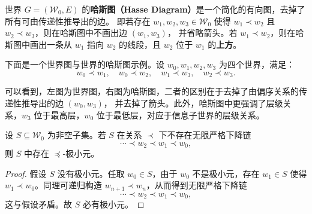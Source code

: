 \begin{definition}[世界的哈斯图]\label{def:hasse}
    世界 $G=(\mathcal{W}_0,E)$ 的\textbf{哈斯图（Hasse Diagram）}是一个简化的有向图，去掉了所有可由传递性推导出的边。
    即若存在 $w_1,w_2,w_3\in\mathcal{W}_0$ 使得 $w_1 \prec w_2$ 且 $w_2 \prec w_3$，则在哈斯图中不画出边 $(w_1,w_3)$，
    并省略箭头。若 $w_1 \prec w_2$，则在哈斯图中画出一条从 $w_1$ 指向 $w_2$ 的线段，且 $w_2$ 位于 $w_1$ 的\textbf{上方}。
\end{definition}
\begin{example}
    下面是一个世界图与世界的哈斯图示例。设 $w_0,w_1,w_2,w_3$ 为四个世界，满足：
    \begin{equation}
        w_0 \prec w_1,\quad w_0 \prec w_2,\quad w_1 \prec w_3,\quad w_2 \prec w_3.
    \end{equation}
    \begin{center}
        \qquad
    \end{center}
    可以看到，左图为世界图，右图为哈斯图，二者的区别在于去掉了由偏序关系的传递性推导出的边 $(w_0,w_3)$，
    并去掉了箭头。此外，哈斯图中更强调了层级关系，$w_3$ 位于最高层，$w_0$ 位于最低层，对应于信息子世界的层级关系。
\end{example}

\begin{lemma}[良基子集的极小元存在]\label{lemma:min}
    设 $S\subseteq\mathcal{W}_0$ 为非空子集。若 $S$ 在关系 $\prec$ 下不存在无限严格下降链
    \begin{equation}
        \cdots \prec w_2 \prec w_1 \prec w_0,
    \end{equation}
    则 $S$ 中存在 $\preceq$-极小元。
\end{lemma}
\begin{proof}
    假设 $S$ 没有极小元。任取 $w_0\in S$，由于 $w_0$ 不是极小元，存在 $w_1\in S$ 使得 $w_1\prec w_0$。同理可递归构造 $w_{n+1}\prec w_n$，从而得到无限严格下降链
    \begin{equation}
        \cdots \prec w_2 \prec w_1 \prec w_0,
    \end{equation}
    这与假设矛盾。故 $S$ 必有极小元。
\end{proof}

